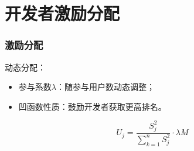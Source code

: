 \section{开发者激励分配}
\begin{frame}
\frametitle{激励分配}
动态分配：
\begin{itemize}
	\item 参与系数$\lambda$：随参与用户数动态调整；
	\item 凹函数性质：鼓励开发者获取更高排名。
\end{itemize}
\[
U_j = \frac{S_j^2}{\sum_{k=1}^n S_j^2}\cdot \lambda M
\]
\end{frame}